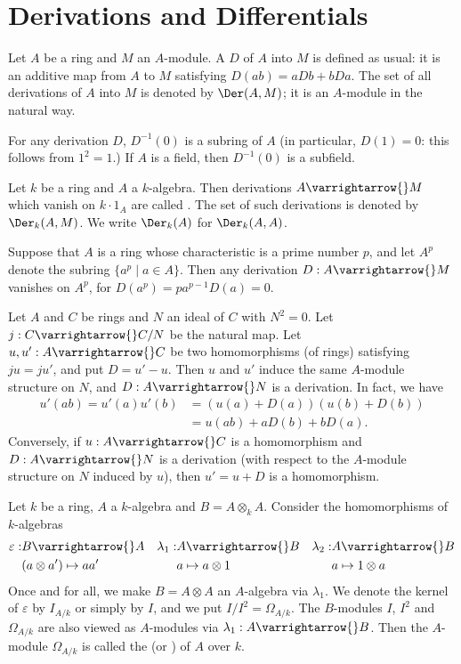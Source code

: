 \documentclass[../main]{subfiles}
\begin{document}
\section{Derivations and Differentials}\label{sec:26}

\newparagraph Let $A$ be a ring and $M$ an $A$-module. A  $D$ of $A$ into $M$ is defined as usual: it is an additive map from $A$ to $M$ satisfying \newline $D(a b)=a D b+b D a$. The set of all derivations of $A$ into $M$ is denoted by $\Der(A, M)$; it is an $A$-module in the natural way.

For any derivation $D$, $D^{-1}(0)$ is a subring of $A$ (in particular, $D(1)=0$: this follows from $1^2=1$.) If $A$ is a field, then $D^{-1}(0)$ is a subfield. 

Let $k$ be a ring and $A$ a $k$-algebra. Then derivations $A \varrightarrow{} M$ which vanish on $k\cdot1_A$ are called . The set of such derivations is denoted by $\Der_k(A, M)$. We write $\Der_k(A)$ for $\Der_k(A, A)$.

Suppose that $A$ is a ring whose characteristic is a prime number $p$, and let $A^p$ denote the subring $\{a^p \mid a \in A\}$. Then any derivation $D:A \varrightarrow{} M$ vanishes on $A^p$, for $D(a^p)=pa^{p-1} D(a) =0$.

\newparagraph Let $A$ and $C$ be rings and $N$ an ideal of $C$ with $N^2=0$. Let \newline $j: C \varrightarrow{} C / N$ be the natural map. Let $u, u': A \varrightarrow{} C$ be two homomorphisms (of rings) satisfying $ju =j u'$, and put $D= u'-u$. Then $u$ and $u'$ induce the same $A$-module structure on $N$, and $D: A \varrightarrow{} N$ is a derivation. In fact, we have
\[
\begin{aligned}
u'(a b)=u'(a) u'(b) &=(u(a)+D(a))(u(b)+D(b)) \\
&=u(a b)+a D(b)+b D(a).
\end{aligned}
\]
Conversely, if $u: A \varrightarrow{} C$ is a homomorphism and $D: A \varrightarrow{} N$ is a derivation (with respect to the $A$-module structure on $N$ induced by $u$), then $u'=u+D$ is a homomorphism.

\newparagraph Let $k$ be a ring, $A$ a $k$-algebra and $B=A \otimes_k A$. Consider the homomorphisms of $k$-algebras
\[\begin{aligned}
\varepsilon:& B \varrightarrow{} A & \lambda_1:& A \varrightarrow{} B & \lambda_2:&A\varrightarrow{}B\\
&(a\otimes a') \mapsto aa' & &a\mapsto a\otimes 1 & & a \mapsto 1 \otimes a 
\end{aligned}\]
Once and for all, we make $B=A \otimes A$ an $A$-algebra via $\lambda_1$. We denote the kernel of $\varepsilon$ by $I_{A / k}$ or simply by $I$, and we put $I / I^2=\Omega_{A / k}$. The $B$-modules $I$, $I^2$ and $\Omega_{A/k}$ are also viewed as $A$-modules via $\lambda_1: A \varrightarrow{} B$. Then the $A$-module $\Omega_{A/k}$ is called the  (or ) of $A$ over $k$.
\end{document}

